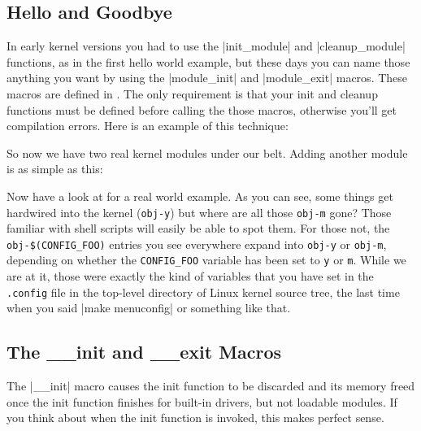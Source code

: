 \documentclass[10pt, oneside]{book}
\begin{document}
\subsection{Hello and Goodbye}
\label{hello_n_goodbye}
In early kernel versions you had to use the \cpp|init_module| and \cpp|cleanup_module| functions, as in the first hello world example, but these days you can name those anything you want by using the \cpp|module_init| and \cpp|module_exit| macros.
These macros are defined in .
The only requirement is that your init and cleanup functions must be defined before calling the those macros, otherwise you'll get compilation errors.
Here is an example of this technique:


So now we have two real kernel modules under our belt. Adding another module is as simple as this:


Now have a look at  for a real world example.
As you can see, some things get hardwired into the kernel (\verb|obj-y|) but where are all those \verb|obj-m| gone?
Those familiar with shell scripts will easily be able to spot them.
For those not, the \verb|obj-$(CONFIG_FOO)| entries you see everywhere expand into \verb|obj-y| or \verb|obj-m|, depending on whether the \verb|CONFIG_FOO| variable has been set to \verb|y| or \verb|m|.
While we are at it, those were exactly the kind of variables that you have set in the \verb|.config| file in the top-level directory of Linux kernel source tree, the last time when you said \sh|make menuconfig| or something like that.

\subsection{The \_\_init and \_\_exit Macros}
\label{init_n_exit}
The \cpp|__init| macro causes the init function to be discarded and its memory freed once the init function finishes for built-in drivers, but not loadable modules.
If you think about when the init function is invoked, this makes perfect sense.
\end{document}
